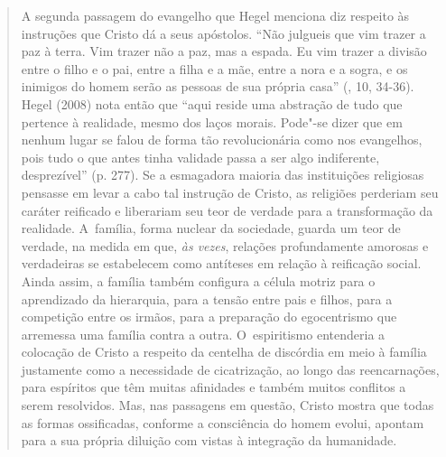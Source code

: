{\begin{quote}
A segunda passagem do evangelho que Hegel menciona diz respeito às
instruções que Cristo dá a seus apóstolos. ``Não julgueis que vim trazer
a paz à terra. Vim trazer não a paz, mas a espada. Eu vim trazer a
divisão entre o filho e o pai, entre a filha e a mãe, entre a nora e a
sogra, e os inimigos do homem serão as pessoas de sua própria casa''
(, 10, 34-36). Hegel (2008) nota então que ``aqui reside uma
abstração de tudo que pertence à realidade, mesmo dos laços morais.
Pode"-se dizer que em nenhum lugar se falou de forma tão revolucionária
como nos evangelhos, pois tudo o que antes tinha validade passa a ser
algo indiferente, desprezível'' (p. 277). Se a esmagadora maioria das
instituições religiosas pensasse em levar a cabo tal instrução de
Cristo, as religiões perderiam seu caráter reificado e liberariam seu
teor de verdade para a transformação da realidade. A~família, forma
nuclear da sociedade, guarda um teor de verdade, na medida em que,
\emph{às vezes}, relações profundamente amorosas e verdadeiras se
estabelecem como antíteses em relação à reificação social. Ainda assim,
a família também configura a célula motriz para o aprendizado da
hierarquia, para a tensão entre pais e filhos, para a competição entre
os irmãos, para a preparação do egocentrismo que arremessa uma família
contra a outra. O~espiritismo entenderia a colocação de Cristo a
respeito da centelha de discórdia em meio à família justamente como a
necessidade de cicatrização, ao longo das reencarnações, para espíritos
que têm muitas afinidades e também muitos conflitos a serem resolvidos.
Mas, nas passagens em questão, Cristo mostra que todas as formas
ossificadas, conforme a consciência do homem evolui, apontam para a sua
própria diluição com vistas à integração da humanidade.


\end{quote}}
